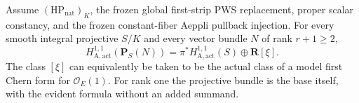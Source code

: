 \begin{theorem}
\label{r15i:aeppli}
Assume $(\mathrm{HP}_{\mathrm{nat}})_K$, the frozen global
first-strip PWS replacement, proper scalar constancy, and the
frozen constant-fiber Aeppli pullback injection.  For every
smooth integral projective $S/K$ and every vector bundle $N$
of rank $r+1\geq2$,
\[
 H_{\mathrm A,\mathrm{act}}^{1,1}(\mathbf P_S(N))
      =\pi^*H_{\mathrm A,\mathrm{act}}^{1,1}(S)
                                      \oplus\mathbf R[\xi].
\tag{I15.12}\label{r15i:aeppli-formula}
\]
The class $[\xi]$ can equivalently be taken to be the actual
class of a model first Chern form for $\mathcal O_E(1)$.
For rank one the projective bundle is the base itself, with
the evident formula without an added summand.
\end{theorem}

